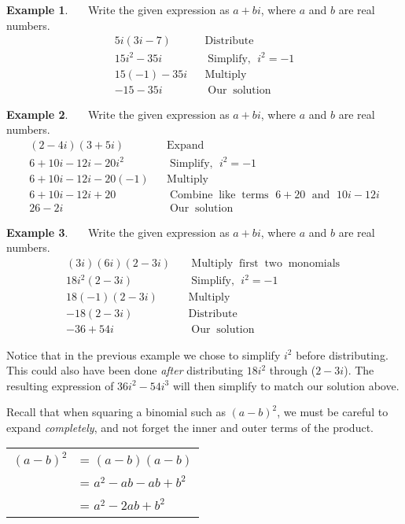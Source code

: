 \documentclass[12pt]{book}
\theoremstyle{definition}
\newtheorem{example}{Example}
\newcommand{\tmop}[1]{\ensuremath{\operatorname{#1}}}
\begin{document}
\begin{example}~~~Write the given expression as $a+bi$, where $a$ and $b$ are real numbers.
  \begin{eqnarray*}
    5 i (3 i - 7) &  & \tmop{Distribute}\\
    15 i^2 - 35 i &  & \tmop{Simplify,~} i^2 = - 1\\
    15 (- 1) - 35 i &  & \tmop{Multiply}\\
    - 15 - 35 i &  & \tmop{Our} \tmop{solution}
  \end{eqnarray*}
\end{example}
\begin{example}~~~Write the given expression as $a+bi$, where $a$ and $b$ are real numbers.
  \begin{eqnarray*}
    (2 - 4 i) (3 + 5 i) &  & \tmop{Expand}\\
    6 + 10 i - 12 i - 20 i^2~~~ &  & \tmop{Simplify,~} i^2 = - 1\\
    6 + 10 i - 12 i - 20 (- 1) &  & \tmop{Multiply}\\
    6 + 10 i - 12 i + 20~~~~~ &  & \tmop{Combine} \tmop{like} \tmop{terms~} 6 + 20
    \tmop{~and~} 10 i - 12 i\\
    26 - 2 i &  & \tmop{Our} \tmop{solution}
  \end{eqnarray*}
\end{example}
\begin{example}~~~Write the given expression as $a+bi$, where $a$ and $b$ are real numbers.
  \begin{eqnarray*}
    (3 i) (6 i) (2 - 3 i) &  & \tmop{Multiply} \tmop{first} \tmop{two}
    \tmop{monomials}\\
		18i^2(2-3i) & & \tmop{Simplify,~} i^2=-1\\
		18(-1)(2-3i) & & \tmop{Multiply}\\
		-18(2-3i) & & \tmop{Distribute}\\
    -36 + 54 i &  & \tmop{Our} \tmop{solution}
  \end{eqnarray*}
\end{example}
Notice that in the previous example we chose to simplify $i^2$ before distributing.  This could also have been done \textit{after} distributing $18i^2$ through ($2-3i$).  The resulting expression of $36i^2-54i^3$ will then simplify to match our solution above.\par
Recall that when squaring a binomial such as $(a-b)^2$, we must be careful to expand {\it completely}, and not forget the inner and outer terms of the product.
\begin{center}
\begin{tabular}{cl}
$(a-b)^2$ & = $(a-b)(a-b)$\\
&= $a^2-ab-ab+b^2$\\
&= $a^2-2ab+b^2$
\end{tabular}
\end{center}
\end{document}
